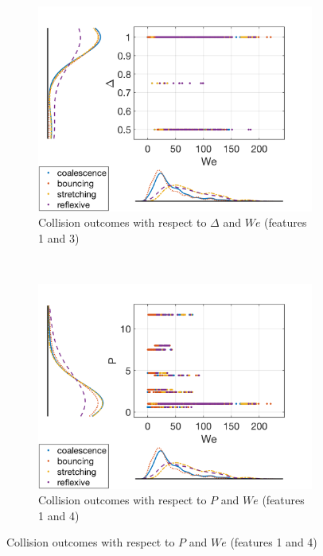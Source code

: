 \documentclass{article}
\begin{document}
\begin{figure}[h!]
    \centering
    \begin{subfigure}[b]{0.4\textwidth}
        \includegraphics[width=\textwidth]{../figures/data_scatterhist1.png}
        \caption{\centering Collision outcomes with respect to $\Delta$ and $We$ (features 1 and 3)}
        \label{fig:data1}
    \end{subfigure}
    ~ %
    \begin{subfigure}[b]{0.4\textwidth}
        \includegraphics[width=\textwidth]{../figures/data_scatterhist2.png}
        \caption{\centering Collision outcomes with respect to $P$ and $We$ (features 1 and 4)}

\end{subfigure}
\end{figure}
\end{document}
